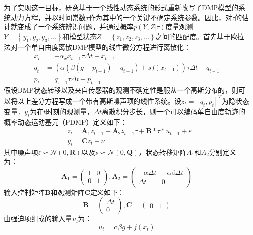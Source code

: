 为了实现这一目标，研究基于一个线性动态系统的形式重新改写了DMP模型的系统动力方程，并以时间常数$τ$作为其中的一个关键不确定系统参数。因此，对$τ$的估计就变成了一个系统辨识问题，并通过概率$p(Y,Z|τ)$度量观测$Y=\left\{y_1,y_2,y_3,...\right\}$和模型状态$Z=\left\{z_1,z_2,z_3,...\right\}$之间的匹配度。首先基于欧拉法对一个单自由度离散DMP模型的线性微分方程进行离散化：
\begin{equation}
    \begin{aligned}
    x_t & =-\alpha_x x_{t-1} \tau \Delta t+x_{t-1} \\
    q_t & =\left(\alpha\left(\beta\left(g-p_{t-1}\right)-q_{t-1}\right)+s f\left(x_{t-1}\right)\right) \tau \Delta t+q_{t-1} \\
    p_t & =q_{t-1} \tau \Delta t+p_{t-1}
    \end{aligned}
    \label{eq:4-11}
\end{equation}
假设DMP状态转移以及来自传感器的观测不确定性是服从一个高斯分布的，则可以将以上差分方程写成一个带有高斯噪声项的线性系统。设$z_t = [q_t,p_t]^T$为隐状态变量，$y_t$为在$t$时刻的观测量，$\Delta t$离散积分步长，则一个可以编码单自由度轨迹的概率动态运动基元（PDMP）定义如下：
\begin{equation}
    \begin{aligned}
    & z_t=\mathbf{A}_1 z_{t-1}+\mathbf{A}_2 z_{t-1} \tau+\mathbf{B} * \tau * u_{t-1}+\varepsilon \\
    & y_t=\mathbf{C} z_t+\nu
    \end{aligned}
    \label{eq:4-12}
\end{equation}
其中噪声项$\varepsilon \backsim \mathcal N(0,\mathbf{R})$以及$\nu \backsim \mathcal N(0,\mathbf{Q})$，状态转移矩阵$A_1$和$A_2$分别定义为：
\begin{equation}
    \mathbf{A}_1=\left(\begin{array}{ll}
    1 & 0 \\
    0 & 1
    \end{array}\right), \mathbf{A}_2=\left(\begin{array}{cc}
    -\alpha \Delta t & -\alpha \beta \Delta t \\
    \Delta t & 0
    \end{array}\right)
    \label{eq:4-13}
\end{equation}
输入控制矩阵$\mathbf{B}$和观测矩阵$\mathbf{C}$定义如下：
\begin{equation}
    \mathbf{B}=\left(\begin{array}{c}
    \Delta t \\
    0
    \end{array}\right), \mathbf{C}=\left(\begin{array}{ll}
    0 & 1
    \end{array}\right)
    \label{eq:4-14}
\end{equation}
由强迫项组成的输入量$u_t$为：
\begin{equation}
    u_t=\alpha \beta g+ f\left(x_t\right)
    \label{eq:4-15}
\end{equation}

